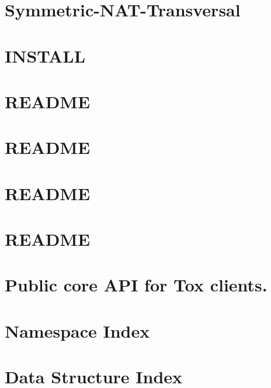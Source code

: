 \documentclass[twoside]{book}
\newcommand{\+}{\discretionary{\mbox{\scriptsize$\hookleftarrow$}}{}{}}
\begin{document}
\chapter{Symmetric-\/\+N\+A\+T-\/\+Transversal}
\label{d5/df6/md_docs_updates__symmetric-_n_a_t-_transversal}
\hypertarget{d5/df6/md_docs_updates__symmetric-_n_a_t-_transversal}{}

\chapter{I\+N\+S\+T\+A\+L\+L}
\label{d8/de3/md__i_n_s_t_a_l_l}
\hypertarget{d8/de3/md__i_n_s_t_a_l_l}{}

\chapter{R\+E\+A\+D\+M\+E}
\label{d2/d5e/md_other_apidsl__r_e_a_d_m_e}
\hypertarget{d2/d5e/md_other_apidsl__r_e_a_d_m_e}{}

\chapter{R\+E\+A\+D\+M\+E}
\label{dd/db8/md_other_astyle__r_e_a_d_m_e}
\hypertarget{dd/db8/md_other_astyle__r_e_a_d_m_e}{}

\chapter{R\+E\+A\+D\+M\+E}
\label{d0/d6a/md_other_bootstrap_daemon__r_e_a_d_m_e}
\hypertarget{d0/d6a/md_other_bootstrap_daemon__r_e_a_d_m_e}{}

\chapter{R\+E\+A\+D\+M\+E}
\label{d3/dcc/md__r_e_a_d_m_e}
\hypertarget{d3/dcc/md__r_e_a_d_m_e}{}

\chapter{Public core A\+P\+I for Tox clients.}
\label{de/d25/core}
\hypertarget{de/d25/core}{}

\chapter{Namespace Index}

\chapter{Data Structure Index}

\end{document}
